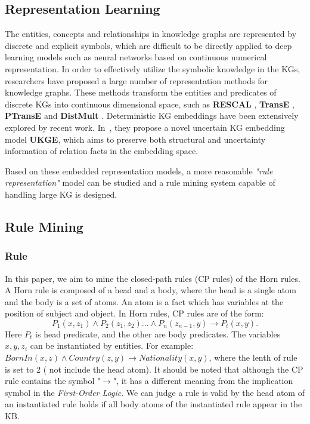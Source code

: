 \documentclass{article}
\begin{document}
	\subsection{Representation Learning}
	The entities, concepts and relationships in knowledge graphs are represented by discrete and explicit symbols, which are difficult to be directly applied to deep learning models such as neural networks based on continuous numerical representation. 
	In order to effectively utilize the symbolic knowledge in the KGs, researchers have proposed a large number of representation methods for knowledge graphs. These methods transform the entities and predicates of discrete KGs into continuous dimensional space, such as {\bf RESCAL} \cite{Nickel:RESCAL}, {\bf TransE} \cite{Bordes:transe}, {\bf PTransE} \cite{Liu:ptranse} and {\bf DistMult} \cite{Yang:2015}. Deterministic KG embeddings have been extensively explored by recent work. In~\cite{UKG2018}, they propose a novel uncertain KG embedding model {\bf UKGE}, which aims to preserve both structural and uncertainty information of relation facts in the embedding space. 

	Based on these embedded representation models, a more reasonable {\em "rule representation"} model can be studied and a rule mining system capable of handling large KG is designed. 
	
	\subsection{Rule Mining}
	\subsubsection{Rule} In this paper, we aim to mine the closed-path rules (CP rules) of the Horn rules. A Horn rule is composed of a head and a body, where the head is a single atom and the body is a set of atoms. An atom is a fact which has variables at the position of subject and object. In Horn rules, CP rules are of the form: 
	\begin{equation} 
	P_1(x, z_1) \wedge P_2(z_1, z_2)... \wedge P_n(z_{n-1}, y) \to P_t(x, y). 
	 \label{eq:cp rule}
	\end{equation}
	Here $P_t$ is head predicate, and the other are body predicates. The variables $x, y, z_i$ can be instantiated by entities. For example: $BornIn(x, z) \wedge Country(z, y) \to Nationality(x, y)$, where the lenth of rule is set to 2 ( not include the head atom).
	It should be noted that although the CP rule contains the symbol "$\to$", it has a different meaning from the implication symbol in the {\em First-Order Logic}. We can judge a rule is valid by the head atom of an instantiated rule holds if all body atoms of the instantiated rule appear in the KB. 
	
\end{document}
